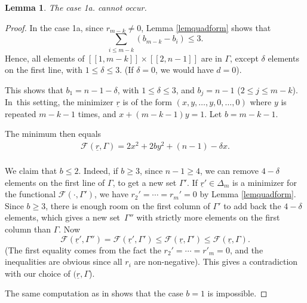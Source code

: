 \documentclass[JEP,XML,SOM,Unicode, NoEqCountersInSection,NoFloatCountersInSection,published]{cedram}
\let\mathcal\mathscr
\newcommand{\llbracket}{[\![}
\newcommand{\rrbracket}{]\!]}
\theoremstyle{theorem}
\newtheorem{lemma}[proposition]{Lemma}
\theoremstyle{definition}
\begin{document}
\begin{lemma}
The case 1a. cannot occur.
\end{lemma}
\begin{proof}

In the case 1a, since $r_{m- k} \neq 0$, Lemma \ref{lemquadform} shows that
\[
\sum_{i \leq m-k} (b_{m-k} - b_i) \leq 3.
\]
Hence, all elements of $\llbracket 1, m - k\rrbracket \times \llbracket 2, n-1 \rrbracket$ are in $\Gamma$, except $\delta$ elements on the first line, with $1 \leq \delta \leq 3$. (If $\delta = 0$, we would have $d = 0$).

This shows that $b_{1} = n- 1 - \delta$, with $1 \leq \delta \leq 3$, and $b_j = n- 1$ ($2 \leq j \leq m- k$). In~this setting, the minimizer $\underline{r}$ is of the form $(x, y,\dots, y, 0,\dots, 0)$ where $y$ is repeated $m-k-1$ times, and $x + (m-k-1)y = 1$. Let $b = m - k -1$.

The minimum then equals
\[
\begin{aligned}
\mathcal F(\underline{r}, \Gamma) = 2 x^2 + 2 b y^2 + (n-1) - \delta x. \\
\end{aligned}
\]

We claim that $b \leq 2$. Indeed, if $b \geq 3$, since $n - 1 \geq 4$, we can remove $4 - \delta$ elements on the first line of $\Gamma$, to get a new set $\Gamma'$. If $\underline{r}' \in \Delta_{m}$ is a minimizer for the functional $\mathcal F(\cdot, \Gamma')$, we have $r_2' =\cdots= r_m' = 0$ by Lemma \ref{lemquadform}. Since $b \geq 3$, there is enough room on the first column of $\Gamma'$ to add back the $4 - \delta$ elements, which gives a new set~$\Gamma''$ with strictly more elements on the first column than $\Gamma$. Now
\[
\mathcal F(\underline{r}', \Gamma'') = \mathcal F(\underline{r}', \Gamma') \leq \mathcal F(\underline{r}, \Gamma') \leq \mathcal F(\underline{r}, \Gamma).
\]
(The first equality comes from the fact the $r_2' =\cdots= r'_m = 0$, and the inequalities are obvious since all $r_i$ are non-negative). This gives a contradiction with our choice of $(\underline{r}, \Gamma$).

The same computation as in \cite[Lem.\,3.14]{cad18} shows that the case $b = 1$ is impossible.


\end{proof}
\end{document}
